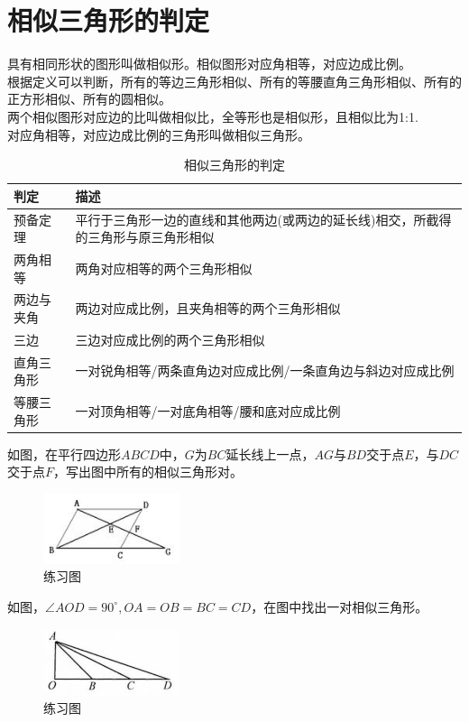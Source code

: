 \documentclass{ecnuthesis}
\begin{document}
\section{相似三角形的判定}
\begin{knowledge}
    具有相同形状的图形叫做相似形。相似图形对应角相等，对应边成比例。\\
    根据定义可以判断，所有的等边三角形相似、所有的等腰直角三角形相似、所有的正方形相似、所有的圆相似。\\
    两个相似图形对应边的比叫做相似比，全等形也是相似形，且相似比为1:1. \\
    对应角相等，对应边成比例的三角形叫做相似三角形。
\end{knowledge}
\begin{table}[H]
\centering
\caption{相似三角形的判定}
\begin{tabular}{l|p{12cm}}
\hline
\hline
判定 & 描述 \\
\hline
预备定理 & 平行于三角形一边的直线和其他两边(或两边的延长线)相交，所截得的三角形与原三角形相似\\
\hline
两角相等 & 两角对应相等的两个三角形相似 \\
\hline
两边与夹角 & 两边对应成比例，且夹角相等的两个三角形相似 \\
\hline
三边 & 三边对应成比例的两个三角形相似 \\
\hline
直角三角形 & 一对锐角相等/两条直角边对应成比例/一条直角边与斜边对应成比例 \\
\hline
等腰三角形 & 一对顶角相等/一对底角相等/腰和底对应成比例 \\
\hline
\hline
\end{tabular}
\end{table}
\begin{problem}
    如图，在平行四边形$ABCD$中，$G$为$BC$延长线上一点，$AG$与$BD$交于点$E$，与$DC$交于点$F$，写出图中所有的相似三角形对。
\end{problem}
\begin{figure}[H]
\centering
\includegraphics[width=4cm]{picture/821.jpg}
\caption{练习图}
\end{figure}
\begin{problem}
    如图，$\angle AOD=90^\circ,OA=OB=BC=CD$，在图中找出一对相似三角形。
\end{problem}
\begin{figure}[H]
\centering
\includegraphics[width=4cm]{picture/847.png}
\caption{练习图}
\end{figure}
\end{document}
